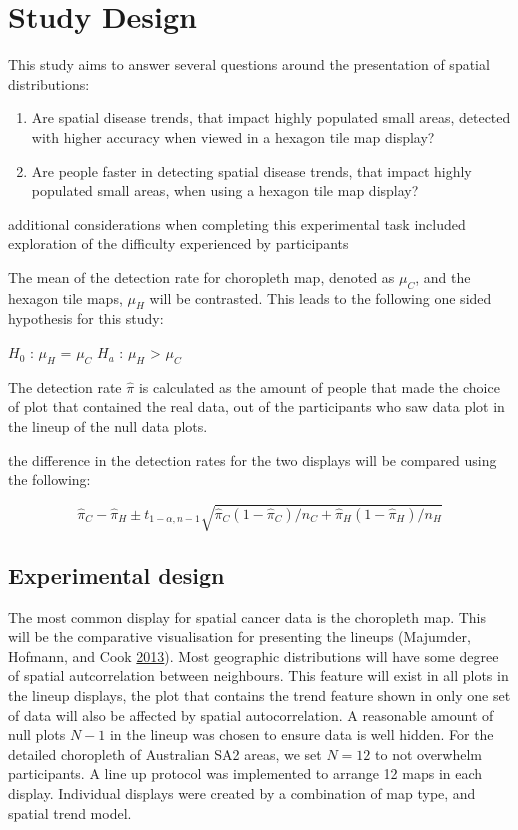 \documentclass[conference,final,]{IEEEtran}
\begin{document}
\hypertarget{study-design}{%
\section{Study Design}\label{study-design}}

This study aims to answer several questions around the presentation of
spatial distributions:

\begin{enumerate}
\def\labelenumi{\arabic{enumi}.}
\item
  Are spatial disease trends, that impact highly populated small areas,
  detected with higher accuracy when viewed in a hexagon tile map
  display?
\item
  Are people faster in detecting spatial disease trends, that impact
  highly populated small areas, when using a hexagon tile map display?
\end{enumerate}

additional considerations when completing this experimental task
included exploration of the difficulty experienced by participants

The mean of the detection rate for choropleth map, denoted as \(\mu_C\),
and the hexagon tile maps, \(\mu_H\) will be contrasted. This leads to
the following one sided hypothesis for this study:

\(H_0\) : \(\mu_H\) = \(\mu_C\) \(H_a\) : \(\mu_H\) \textgreater{}
\(\mu_C\)

The detection rate \(\hat\pi\) is calculated as the amount of people
that made the choice of plot that contained the real data, out of the
participants who saw data plot in the lineup of the null data plots.

the difference in the detection rates for the two displays will be
compared using the following:

\[ \hat\pi_C - \hat\pi_H \pm t_{1-\alpha,n-1}\sqrt{\hat\pi_C(1-\hat\pi_C)/n_C + \hat\pi_H(1-\hat\pi_H)/n_H} \]

\hypertarget{experimental-design}{%
\subsection{Experimental design}\label{experimental-design}}

The most common display for spatial cancer data is the choropleth map.
This will be the comparative visualisation for presenting the lineups
(Majumder, Hofmann, and Cook \protect\hyperlink{ref-VVSIALM}{2013}).
Most geographic distributions will have some degree of spatial
autcorrelation between neighbours. This feature will exist in all plots
in the lineup displays, the plot that contains the trend feature shown
in only one set of data will also be affected by spatial
autocorrelation. A reasonable amount of null plots \(N-1\) in the lineup
was chosen to ensure data is well hidden. For the detailed choropleth of
Australian SA2 areas, we set \(N = 12\) to not overwhelm participants. A
line up protocol was implemented to arrange 12 maps in each display.
Individual displays were created by a combination of map type, and
spatial trend model.
\end{document}
